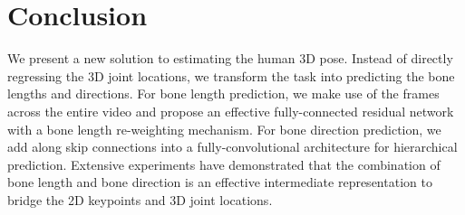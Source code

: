 \documentclass[journal]{IEEEtran}
\begin{document}
 \section{Conclusion}

We present a new solution to estimating the human 3D pose. Instead of directly regressing the 3D joint locations, we transform the task into predicting the bone lengths and directions. For bone length prediction, we make use of the frames across the entire video and propose an effective fully-connected residual network with a bone length re-weighting mechanism. For bone direction prediction, we add along skip connections into a fully-convolutional architecture for hierarchical prediction. Extensive experiments have demonstrated that the combination of bone length and bone direction is an effective intermediate representation to bridge the 2D keypoints and 3D joint locations. 
\end{document}
